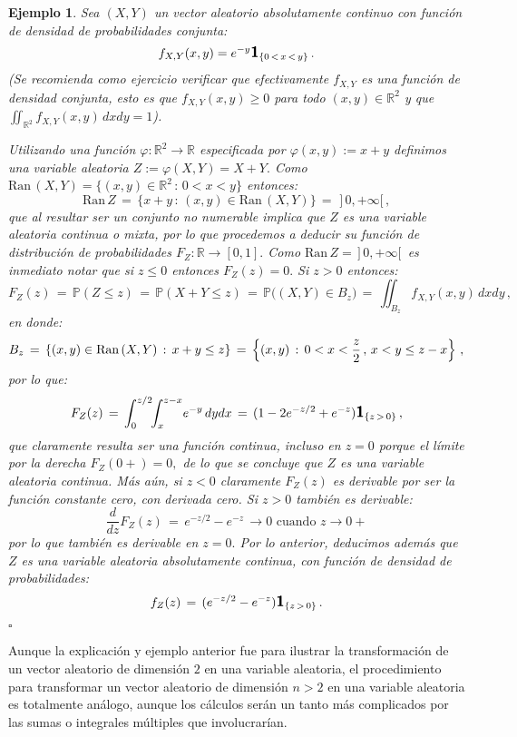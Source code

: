 \documentclass[spanish,10pt,letterpaper]{article}
\newtheorem{ejem}{Ejemplo}
\newcommand{\prob}{\mathbb{P}}
\newcommand{\Runo}{\mathbb{R}}
\newcommand{\indic}{\textbf{\textsf{\large{1}}}}
\newcommand{\qed}{\begin{flushright}$\square$\end{flushright}}
\begin{document}
\begin{ejem}\label{ej:transfZvXY}
    Sea $(X,Y)$ un vector aleatorio absolutamente continuo con función de densidad de probabilidades conjunta:
    $$f_{X,Y}(x,y)=e^{-y}\indic_{\{0\,<\,x\,<\,y\}}\,.$$
    (Se recomienda como ejercicio verificar que efectivamente $f_{X,Y}$ es una función de densidad conjunta, esto es que $f_{X,Y}(x,y)\geq 0$ para todo $(x,y)\in\Runo^2$ y que $\iint_{\Runo^2}f_{X,Y}(x,y)\,dxdy=1$).\par\medskip 

    \noindent Utilizando una función $\varphi:\Runo^2\rightarrow\Runo$ especificada por $\varphi(x,y):=x+y$ definimos una variable aleatoria $Z:=\varphi(X,Y)=X+Y.$ Como $\text{Ran}\,(X,Y)=\{(x,y)\in\Runo^2\,:\,0<x<y\}$ entonces:
    $$\text{Ran}\,Z \,=\, \{x+y\,:\,(x,y)\in\text{Ran}\,(X,Y)\} \,=\, \,]\,0,+\infty[\,,$$
    que al resultar ser un conjunto no numerable implica que $Z$ es una variable aleatoria continua o mixta, por lo que procedemos a deducir su función de distribución de probabilidades $F_Z:\Runo\rightarrow[0,1].$ Como $\text{Ran}\,Z=\,]\,0,+\infty[\,$ es inmediato notar que si $z\leq 0$ entonces $F_Z(z)=0.$ Si $z>0$ entonces:
    $$F_Z(z) \,=\, \prob(Z\leq z) \,=\, \prob(X+Y\leq z) \,=\, \prob\big((X,Y)\in B_z\big) \,=\, \iint_{B_z}f_{X,Y}(x,y)\,dxdy\,,$$
    en donde:
    $$B_z \,=\, \{(x,y)\in\text{Ran\,}(X,Y)\,:\,x+y\leq z\} \,=\, \left\{(x,y)\,:\,0<x<\frac{z}{2}\,,\,x<y\leq z-x\right\}\,,$$
    por lo que:
    $$F_Z(z) \,=\, \int_{0}^{z/2}\!\!\int_{x}^{z-x}\!  e^{-y}\,dydx \,=\, (1-2e^{-z/2}+e^{-z})\indic_{\{z\,>\,0\}}\,,$$
    que claramente resulta ser una función continua, incluso en $z=0$ porque el límite por la derecha $F_Z(0+)=0,$ de lo que se concluye que $Z$ es una variable aleatoria continua. Más aún, si $z<0$ claramente $F_Z(z)$ es derivable por ser la función constante cero, con derivada cero. Si $z>0$ también es derivable:
    $$\frac{d}{dz}F_Z(z) \,=\, e^{-z/2} - e^{-z} \,\longrightarrow 0 \,\,\text{cuando } z\rightarrow 0+$$
    por lo que también es derivable en $z=0.$ Por lo anterior, deducimos además que $Z$ es una variable aleatoria absolutamente continua, con función de densidad de probabilidades:
    $$f_Z(z) \,=\, (e^{-z/2} - e^{-z})\indic_{\{z\,>\,0\}}\,.$$ \qed
\end{ejem}

Aunque la explicación y ejemplo anterior fue para ilustrar la transformación de un vector aleatorio de dimensión $2$ en una variable aleatoria, el procedimiento para transformar un vector aleatorio de dimensión $n>2$ en una variable aleatoria es totalmente análogo, aunque los cálculos serán un tanto más complicados por las sumas o integrales múltiples que involucrarían.
\end{document}
